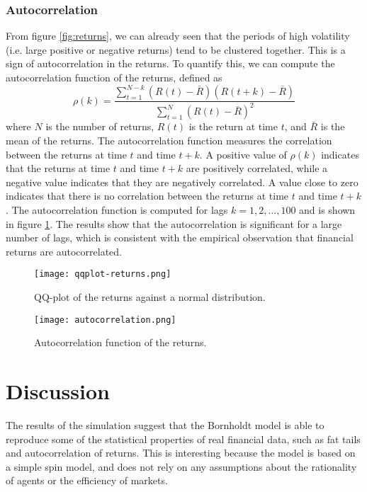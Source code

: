 \subsubsection{Autocorrelation}
From figure \ref{fig:returns}, we can already seen that the periods of high volatility (i.e. large positive or negative returns) tend to be clustered together. This is a sign of autocorrelation in the returns. To quantify this, we can compute the autocorrelation function of the returns, defined as
\begin{equation}
    \rho(k) = \frac{\sum_{t=1}^{N-k} (R(t) - \bar{R})(R(t+k) - \bar{R})}{\sum_{t=1}^{N} (R(t) - \bar{R})^2}
\end{equation}
where $N$ is the number of returns, $R(t)$ is the return at time $t$, and $\bar{R}$ is the mean of the returns. The autocorrelation function measures the correlation between the returns at time $t$ and time $t+k$. A positive value of $\rho(k)$ indicates that the returns at time $t$ and time $t+k$ are positively correlated, while a negative value indicates that they are negatively correlated. A value close to zero indicates that there is no correlation between the returns at time $t$ and time $t+k$.
The autocorrelation function is computed for lags $k=1,2,\ldots,100$ and is shown in figure \ref{fig:autocorrelation}. The results show that the autocorrelation is significant for a large number of lags, which is consistent with the empirical observation that financial returns are autocorrelated.

\begin{figure}[H]
    \centering
    \begin{minipage}{0.45\textwidth}
        \centering
        \texttt{[image: qqplot-returns.png]}
        \caption{QQ-plot of the returns against a normal distribution.}
        \label{fig:qqplot}
    \end{minipage}
    \hfill
    \begin{minipage}{0.45\textwidth}
        \centering
        \texttt{[image: autocorrelation.png]}
        \caption{Autocorrelation function of the returns.}
        \label{fig:autocorrelation}
    \end{minipage}
\end{figure}


\section{Discussion}
The results of the simulation suggest that the Bornholdt model is able to reproduce some of the statistical properties of real financial data, such as fat tails and autocorrelation of returns. This is interesting because the model is based on a simple spin model, and does not rely on any assumptions about the rationality of agents or the efficiency of markets.

